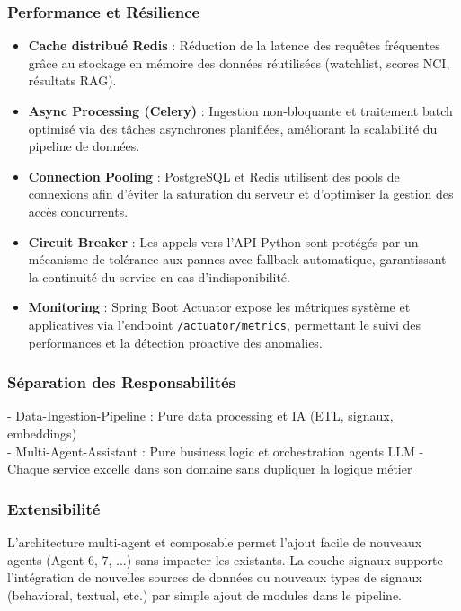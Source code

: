 \subsubsection{Performance et Résilience}
\begin{itemize}
    \item \textbf{Cache distribué Redis} : Réduction de la latence des requêtes fréquentes grâce au stockage en mémoire des données réutilisées (watchlist, scores NCI, résultats RAG).
    
    \item \textbf{Async Processing (Celery)} : Ingestion non-bloquante et traitement batch optimisé via des tâches asynchrones planifiées, améliorant la scalabilité du pipeline de données.
    
    \item \textbf{Connection Pooling} : PostgreSQL et Redis utilisent des pools de connexions afin d’éviter la saturation du serveur et d’optimiser la gestion des accès concurrents.
    
    \item \textbf{Circuit Breaker} : Les appels vers l’API Python sont protégés par un mécanisme de tolérance aux pannes avec fallback automatique, garantissant la continuité du service en cas d’indisponibilité.
    
    \item \textbf{Monitoring} : Spring Boot Actuator expose les métriques système et applicatives via l’endpoint \texttt{/actuator/metrics}, permettant le suivi des performances et la détection proactive des anomalies.
\end{itemize}
\subsubsection{Séparation des Responsabilités}
- Data-Ingestion-Pipeline : Pure data processing et IA (ETL, signaux, embeddings)\\
- Multi-Agent-Assistant : Pure business logic et orchestration agents LLM
- Chaque service excelle dans son domaine sans dupliquer la logique métier
\subsubsection{Extensibilité}
L'architecture multi-agent et composable permet l'ajout facile de nouveaux agents (Agent 6, 7, ...) sans impacter les existants. La couche signaux supporte l'intégration de nouvelles sources de données ou nouveaux types de signaux (behavioral, textual, etc.) par simple ajout de modules dans le pipeline.

